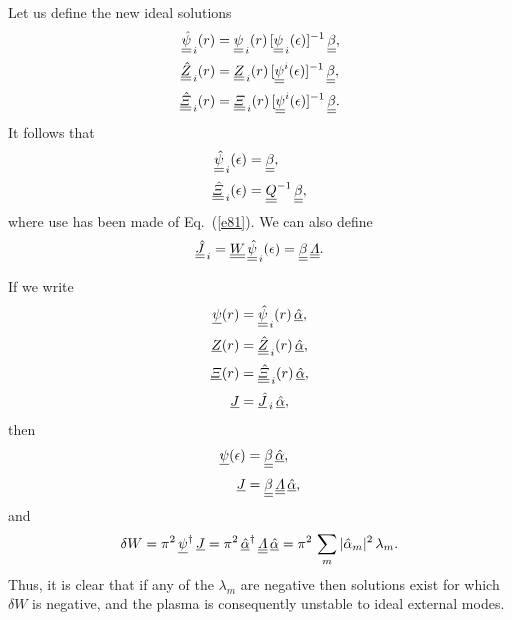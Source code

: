 \documentclass[12pt,prb,aps,notitlepage]{revtex4-1}
\begin{document}
Let us define the new ideal solutions
\begin{align}
\underline{\underline{\hat{\psi}}}_{\,i}(r)&=\underline{\underline{\psi}}_{\,i}(r)\,[\underline{\underline{\psi}}_{\,i}(\epsilon)]^{-1}\,\underline{\underline{\beta}},\\[0.5ex]
\underline{\underline{\hat{Z}}}_{\,i}(r)   &=\underline{\underline{Z}}_{\,i}(r)\,[\underline{\underline{\psi}}^{i}(\epsilon)]^{-1}\,\underline{\underline{\beta}},\\[0.5ex]
\underline{\underline{\hat{\mit\Xi}}}_{\,i}(r)   &=\underline{\underline{\mit\Xi}}_{\,i}(r)\,[\underline{\underline{\psi}}^{i}(\epsilon)]^{-1}\,\underline{\underline{\beta}}.
\end{align}
It follows that
\begin{align}
\underline{\underline{\hat{\psi}}}_{\,i}(\epsilon)&=\underline{\underline{\beta}},\\[0.5ex]
\underline{\underline{\hat{\mit\Xi}}}_{\,i}(\epsilon)&=\underline{\underline{Q}}^{-1}\,\underline{\underline{\beta}},
\end{align}
where use has been made of Eq.~(\ref{e81}). 
We can also define
\begin{equation}
\underline{\underline{\hat{J}}}_{\,i}=\underline{\underline{W}}\,\underline{\underline{\hat{\psi}}}_{\,i}(\epsilon)= \underline{\underline{\beta}}\,\underline{\underline{\mit\Lambda}}.
\end{equation}

If we write
\begin{align}
\underline{\psi}(r)&= \underline{\underline{\hat{\psi}}}_{\,i}(r)\,\underline{\hat{\alpha}},\\[0.5ex]
\underline{Z}(r)&= \underline{\underline{\hat{Z}}}_{\,i}(r)\,\underline{\hat{\alpha}},\\[0.5ex]
\underline{{\mit\Xi}}(r)&= \underline{\underline{\hat{\mit\Xi}}}_{\,i}(r)\,\underline{\hat{\alpha}},\\[0.5ex]
\underline{J} &=\underline{\hat{J}}_{\,i}\,\underline{\hat{\alpha}},
\end{align}
then
\begin{align}
\underline{\psi}(\epsilon) &=\underline{\underline{\beta}}\,\underline{\hat{\alpha}},\\[0.5ex]
\underline{J} &=\underline{\underline{\beta}}\,\underline{\underline{\mit\Lambda}}\,\underline{\hat{\alpha}},
\end{align}
and 
\begin{equation}
 \delta W=\pi^2\, \underline{\psi}^\dag\,\underline{J}=\pi^2\,\underline{\hat{\alpha}}^\dag\,\underline{\underline{{\mit\Lambda}}}\,\underline{\hat{\alpha}}= \pi^2\,\sum_m |\hat{\alpha}_m|^2\,\lambda_m.
 \end{equation}
Thus, it is clear that if any of the $\lambda_m$ are negative then solutions exist for which $\delta W$ is negative, and the plasma
is consequently unstable to ideal external modes.
\end{document}
